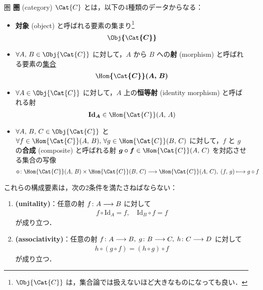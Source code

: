 \documentclass[geometry_main]{subfiles}
\begin{document}
\begin{mydef}[label=def:category, breakable]{圏}
	\textbf{圏} (category) $\Cat{C}$ とは，以下の4種類のデータからなる：
	\begin{itemize}
		\item \textbf{対象} (object) と呼ばれる要素の集まり\footnote{$\Obj{\Cat{C}}$ は，集合論では扱えないほど大きなものになっても良い．}
		\begin{align}
			\bm{\Obj{\Cat{C}}}
		\end{align}
		
		\item $\forall A,\, B \in \Obj{\Cat{C}}$ に対して，$A$ から $B$ への\textbf{射} (morphism) と呼ばれる要素の\underline{集合}
		\begin{align}
			\bm{\Hom{\Cat{C}}(A,\, B)}
		\end{align}
		
		\item $\forall A \in \Obj{\Cat{C}}$ に対して，$A$ 上の\textbf{恒等射} (identity morphism) と呼ばれる射
		\begin{align}
			\bm{\mathrm{Id}_A} \in \Hom{\Cat{C}}(A,\, A)
		\end{align}
		
		\item $\forall A,\, B,\, C \in \Obj{\Cat{C}}$ と $\forall f \in \Hom{\Cat{C}}(A,\, B),\, \forall g \in \Hom{\Cat{C}}(B,\, C)$ に対して，$f$ と $g$ の\textbf{合成} (composite) と呼ばれる射 $\bm{g \circ f} \in \Hom{\Cat{C}}(A,\, C)$ を対応させる集合の写像
		\begin{align}
			\bm{\circ} \colon \Hom{\Cat{C}}(A,\, B) \times \Hom{\Cat{C}}(B,\, C) \lto \Hom{\Cat{C}}(A,\, C),\; (f,\, g) \lmto g\circ f
		\end{align}
	\end{itemize}
	これらの構成要素は，次の2条件を満たさねばならない：
	\begin{enumerate}
		\item \textbf{(unitality)}：任意の射 $f \colon A \longrightarrow B$ に対して
		\begin{align}
			f \circ \mathrm{Id}_A = f,\quad \mathrm{Id}_B \circ f = f
		\end{align}
		が成り立つ．
		\item \textbf{(associativity)}：任意の射 $f \colon A \longrightarrow B,\; g \colon B \longrightarrow C,\; h \colon C \longrightarrow D$ に対して
		\begin{align}
			h \circ (g \circ f) = (h \circ g) \circ f
		\end{align}
		が成り立つ．
	\end{enumerate}
\end{mydef}
\end{document}
